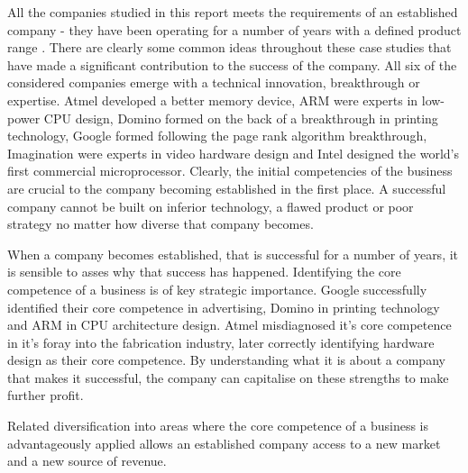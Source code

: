 {}

All the companies studied in this report meets the requirements of an established company - they have been operating for a number of years with a defined product range \cite{kekale2007successful}.
There are clearly some common ideas throughout these case studies that have made a significant contribution to the success of the company.
All six of the considered companies emerge with a technical innovation, breakthrough or expertise.
Atmel developed a better memory device, ARM were experts in low-power CPU design, Domino formed on the back of a breakthrough in printing technology, Google formed following the page rank algorithm breakthrough, Imagination were experts in video hardware design and Intel designed the world's first commercial microprocessor.
Clearly, the initial competencies of the business are crucial to the company becoming established in the first place.
A successful company cannot be built on inferior technology, a flawed product or poor strategy no matter how diverse that company becomes.

When a company becomes established, that is successful for a number of years, it is sensible to asses why that success has happened.
Identifying the core competence of a business is of key strategic importance. 
Google successfully identified their core competence in advertising, Domino in printing technology and ARM in CPU architecture design. 
Atmel misdiagnosed it's core competence in it's foray into the fabrication industry, later correctly identifying hardware design as their core competence.
By understanding what it is about a company that makes it successful, the company can capitalise on these strengths to make further profit.

Related diversification into areas where the core competence of a business is advantageously applied allows an established company access to a new market and a new source of revenue.


